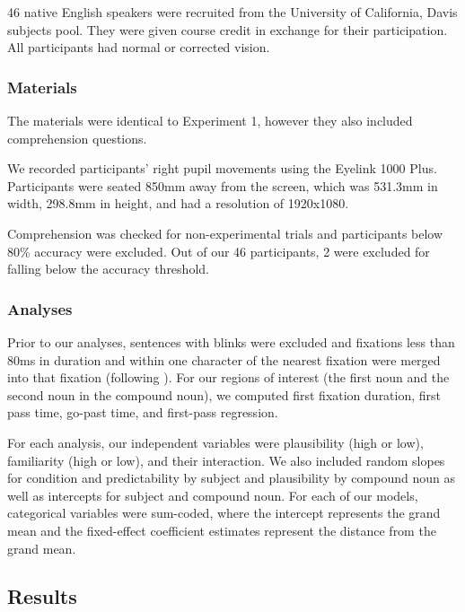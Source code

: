 \documentclass[
  12pt,
  letterpaper,
]{scrreport}
\begin{document}
46 native English speakers were recruited from the University of
California, Davis subjects pool. They were given course credit in
exchange for their participation. All participants had normal or
corrected vision.

\subsubsection{Materials}\label{materials}

The materials were identical to Experiment 1, however they also included
comprehension questions.

We recorded participants' right pupil movements using the Eyelink 1000
Plus. Participants were seated 850mm away from the screen, which was
531.3mm in width, 298.8mm in height, and had a resolution of 1920x1080.

Comprehension was checked for non-experimental trials and participants
below 80\% accuracy were excluded. Out of our 46 participants, 2 were
excluded for falling below the accuracy threshold.

\subsubsection{Analyses}\label{analyses}

Prior to our analyses, sentences with blinks were excluded and fixations
less than 80ms in duration and within one character of the nearest
fixation were merged into that fixation (following
). For
our regions of interest (the first noun and the second noun in the
compound noun), we computed first fixation duration, first pass time,
go-past time, and first-pass regression.

For each analysis, our independent variables were plausibility (high or
low), familiarity (high or low), and their interaction. We also included
random slopes for condition and predictability by subject and
plausibility by compound noun as well as intercepts for subject and
compound noun. For each of our models, categorical variables were
sum-coded, where the intercept represents the grand mean and the
fixed-effect coefficient estimates represent the distance from the grand
mean.

\subsection{Results}\label{results-2}
\end{document}
